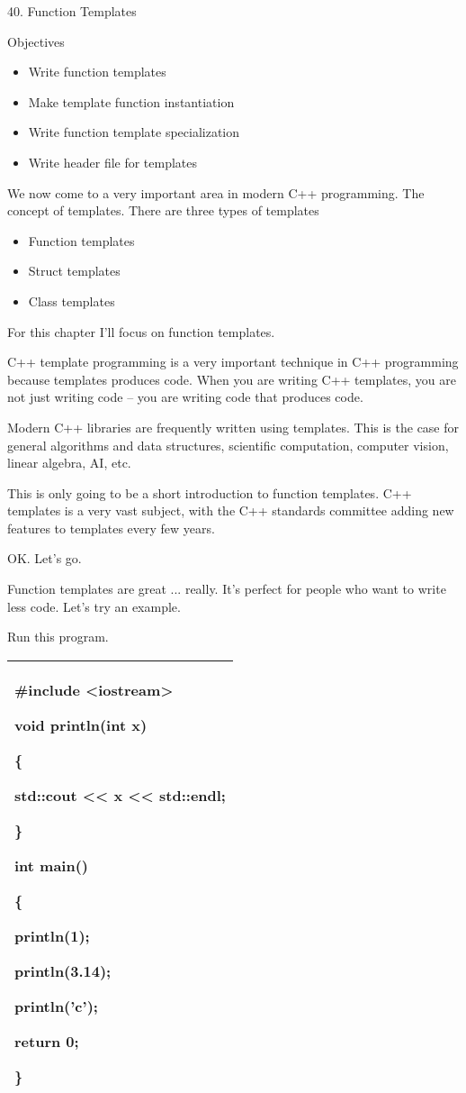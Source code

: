 \documentclass[
]{article}
\author{}
\date{}
\providecommand{\tightlist}{%
  \setlength{\itemsep}{0pt}\setlength{\parskip}{0pt}}
\begin{document}
40. Function Templates

Objectives

\begin{itemize}
\tightlist
\item
  Write function templates
\item
  Make template function instantiation
\item
  Write function template specialization
\item
  Write header file for templates
\end{itemize}

We now come to a very important area in modern C++ programming. The
concept of templates. There are three types of templates

\begin{itemize}
\tightlist
\item
  Function templates
\item
  Struct templates
\item
  Class templates
\end{itemize}

For this chapter I'll focus on function templates.

C++ template programming is a very important technique in C++
programming because templates produces code. When you are writing C++
templates, you are not just writing code -- you are writing code that
produces code.

Modern C++ libraries are frequently written using templates. This is the
case for general algorithms and data structures, scientific computation,
computer vision, linear algebra, AI, etc.

This is only going to be a short introduction to function templates. C++
templates is a very vast subject, with the C++ standards committee
adding new features to templates every few years.

OK. Let's go.

Function templates are great ... really. It's perfect for people who
want to write less code. Let's try an example.

Run this program.

\begin{longtable}[]{@{}l@{}}
\toprule
\endhead
\begin{minipage}[t]{0.97\columnwidth}\raggedright
\#include \textless iostream\textgreater{}

void println(int x)

\{

std::cout \textless\textless{} x \textless\textless{} std::endl;

\}

int main()

\{

println(1);

println(3.14);

println('c');

return 0;

\}\strut
\end{minipage}\tabularnewline
\bottomrule
\end{longtable}
\end{document}
